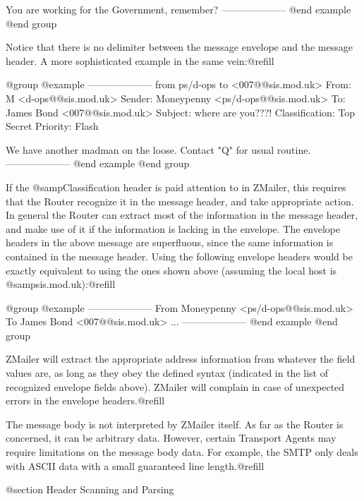 You are working for the Government, remember?
--------------------
@end example
@end group

Notice that there is no delimiter between the message envelope and the
message header.  A more sophisticated example in the same vein:@refill

@group
@example
--------------------
from ps/d-ops
to <007@@sis.mod.uk>
From: M <d-ops@@sis.mod.uk>
Sender: Moneypenny <ps/d-ops@@sis.mod.uk>
To: James Bond <007@@sis.mod.uk>
Subject: where are you???!
Classification: Top Secret
Priority: Flash

We have another madman on the loose.  Contact "Q" for usual routine.
--------------------
@end example
@end group

If the @samp{Classification} header is paid attention to in ZMailer, this
requires that the Router recognize it in the message header, and take
appropriate action.  In general the Router can extract most of the information
in the message header, and make use of it if the information is lacking in the
envelope.  The envelope headers in the above message are superfluous, since
the same information is contained in the message header.  Using the following
envelope headers would be exactly equivalent to using the ones shown above
(assuming the local host is @samp{sis.mod.uk}):@refill

@group
@example
--------------------
From Moneypenny <ps/d-ops@@sis.mod.uk>
To James Bond <007@@sis.mod.uk>
...
--------------------
@end example
@end group

ZMailer will extract the appropriate address information from whatever the
field values are, as long as they obey the defined syntax (indicated in the
list of recognized envelope fields above).  ZMailer will complain in case of
unexpected errors in the envelope headers.@refill

The message body is not interpreted by ZMailer itself.  As far as the Router
is concerned, it can be arbitrary data.  However, certain Transport Agents
may require limitations on the message body data. For example, the
SMTP only deals with ASCII data with a small guaranteed line length.@refill

@section Header Scanning and Parsing

